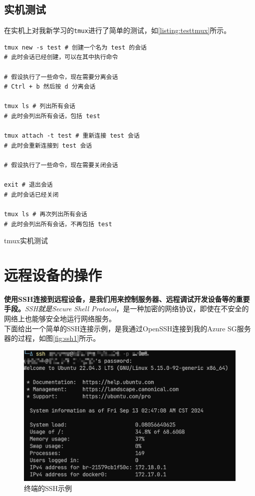 \subsection{实机测试}

在实机上对我新学习的\texttt{tmux}进行了简单的测试，如\autoref{listing:testtmux}所示。

\begin{longlisting}
    \begin{verbatim}
tmux new -s test # 创建一个名为 test 的会话
# 此时会话已经创建，可以在其中执行命令

# 假设执行了一些命令，现在需要分离会话
# Ctrl + b 然后按 d 分离会话

tmux ls # 列出所有会话
# 此时会列出所有会话，包括 test

tmux attach -t test # 重新连接 test 会话
# 此时会重新连接到 test 会话

# 假设执行了一些命令，现在需要关闭会话

exit # 退出会话
# 此时会话已经关闭

tmux ls # 再次列出所有会话
# 此时会列出所有会话，不再包括 test
    \end{verbatim}
    \caption{tmux实机测试}
    \label{listing:testtmux}
\end{longlisting}


\section{远程设备的操作}

\textbf{使用SSH连接到远程设备，是我们用来控制服务器、远程调试开发设备等的重要手段。}\textit{SSH就是Secure Shell Protocol}，是一种加密的网络协议，即使在不安全的网络上也能够安全地运行网络服务。\\

下面给出一个简单的SSH连接示例，是我通过OpenSSH连接到我的Azure SG服务器的过程，如图\autoref{fig:ssh1}所示。

\begin{figure}[!h]
    \centering
    \includegraphics[width=.8\textwidth]{./Figures/ssh1.png}
    \caption{终端的SSH示例}
    \label{fig:ssh1}
\end{figure}

